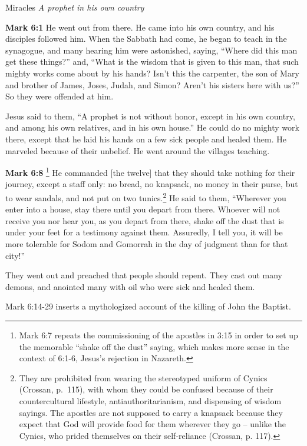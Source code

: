 \documentclass[10pt,twoside]{article} %
\newcommand{\quotesize}{\normalsize{}}
\newcommand{\comm}[1]{\begingroup \color{black!50} #1\endgroup}
\newenvironment{quotetext}{\begingroup\quotesize}{\endgroup}
\newcommand{\bible}[2]{\begin{quotetext}\textbf{#1} #2\end{quotetext}}
\newcommand{\gospelmark}[2]{\bible{Mark #1}{#2}}
\newcommand{\subhead}[1]{\emph{#1}\par}
\begin{document}
\begin{section}{Miracles}
\subhead{A prophet in his own country}

\gospelmark{6:1}{
He went out from there. He came into his own country, and his disciples followed him.   When the Sabbath had come, he began to teach in the synagogue, and many hearing him were astonished, saying, ``Where did this man get these things?'' and, ``What is the wisdom that is given to this man, that such mighty works come about by his hands?   Isn't this the carpenter, the son of Mary and brother of James, Joses, Judah, and Simon? Aren't his sisters here with us?'' So they were offended at him.

  Jesus said to them, ``A prophet is not without honor, except in his own country, and among his own relatives, and in his own house.''   He could do no mighty work there, except that he laid his hands on a few sick people and healed them.   He marveled because of their unbelief.
He went around the villages teaching.   
}

\gospelmark{6:8}{\footnote{Mark 6:7 repeats the commissioning of the apostles in 3:15 in order to set up the memorable ``shake off the dust''
saying, which makes more sense in the context of 6:1-6, Jesus's rejection in Nazareth.}
He commanded [the twelve] that they should take nothing for their journey, except a staff only: no bread, no knapsack, no money in their purse,   but to wear sandals, and not put on two tunics.\footnote{They are prohibited from wearing the stereotyped uniform of Cynics
(Crossan, p.~115), with whom they could be
confused because of their countercultural lifestyle, antiauthoritarianism, and dispensing of wisdom sayings. The apostles
are not supposed to carry a knapsack because they expect that God will provide food for them wherever they go -- unlike the
Cynics, who prided themselves on their self-reliance (Crossan, p. 117).}
He said to them, ``Wherever you enter into a house, stay there until you depart from there.    Whoever will not receive you nor hear you, as you depart from there, shake off the dust that is under your feet for a testimony against them. Assuredly, I tell you, it will be more tolerable for Sodom and Gomorrah in the day of judgment than for that city!'' 


They went out and preached that people should repent.   They cast out many demons, and anointed many with oil who were sick and healed them.
}

\comm{Mark 6:14-29 inserts a mythologized account of the killing of John the Baptist.}


\end{section}
\end{document}
